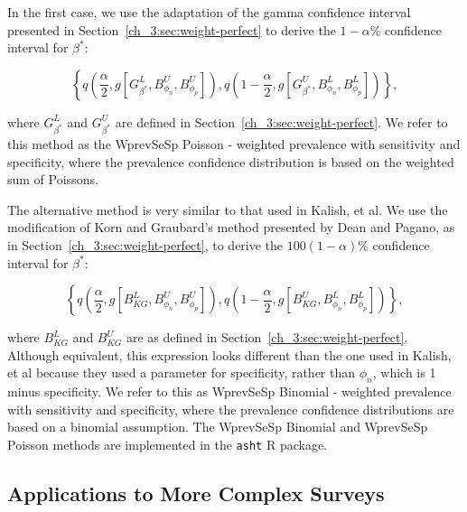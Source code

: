 In the first case, we use the adaptation of the gamma confidence interval\cite{FayF:1997} presented in Section~\ref{ch_3:sec:weight-perfect} to derive the \( 1 - \alpha \)\% confidence interval for \( \beta^* \):

\begin{equation}
    \left\{ q \left( \frac{\alpha}{2}, %
    g \left[ G^L_{\beta^*}, B^U_{\phi_n}, B^U_{\phi_p} \right]
    \right), q \left( 1 - \frac{\alpha}{2}, %
       g \left[G^U_{\beta^*}, B^L_{\phi_n}, B^L_{\phi_p} \right] \right)
       \right\},
\end{equation}

where \( G_{\beta^*}^L \) and \( G_{\beta^*}^U \) are defined in Section~\ref{ch_3:sec:weight-perfect}.
We refer to this method as the WprevSeSp Poisson - weighted prevalence with sensitivity and specificity, where the prevalence confidence distribution is based on the weighted sum of Poissons.

The alternative method is very similar to that used in Kalish, et al.\cite{Kali:2021}
We use the modification of Korn and Graubard's method\cite{Korn:1998} presented by Dean and Pagano,\cite{Dean:2015} as in Section~\ref{ch_3:sec:weight-perfect}, to derive the \( 100(1 - \alpha) \)\% confidence interval for \( \beta^* \):

\begin{equation}
    \left\{ q \left( \frac{\alpha}{2}, g\left[B_{KG}^L, B_{\phi_n}^U, B_{\phi_p}^U\right] \right), q \left( 1 - \frac{\alpha}{2}, g\left[B_{KG}^U, B_{\phi_n}^L, B_{\phi_p}^L\right] \right) \right\},
\end{equation}

where \( B_{KG}^L \) and \( B_{KG}^U \) are as defined in Section~\ref{ch_3:sec:weight-perfect}. Although equivalent, this expression looks different than the one used in Kalish, et al\cite{Kali:2021} because they used a parameter for specificity, rather than $\phi_n$, which is 1 minus specificity.
We refer to this as WprevSeSp Binomial - weighted prevalence with sensitivity and specificity, where the prevalence confidence distributions are based on a binomial assumption.
The WprevSeSp Binomial and WprevSeSp Poisson methods are implemented in the \texttt{asht} R package.\cite{asht}

\subsection{Applications to More Complex Surveys}
\label{ch_3:sec:complex-surveys}


